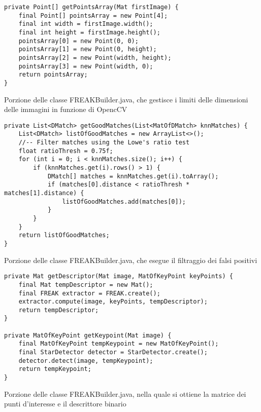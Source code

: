 \begin{listing}[H]
\begin{verbatim}
private Point[] getPointsArray(Mat firstImage) {
    final Point[] pointsArray = new Point[4];
    final int width = firstImage.width();
    final int height = firstImage.height();
    pointsArray[0] = new Point(0, 0);
    pointsArray[1] = new Point(0, height);
    pointsArray[2] = new Point(width, height);
    pointsArray[3] = new Point(width, 0);
    return pointsArray;
}
\end{verbatim}
\caption{Porzione delle classe FREAKBuilder.java, che gestisce i limiti delle dimensioni delle immagini in funzione di OpencCV}\label{lst:points}
\end{listing}


\begin{listing}[H]
\begin{verbatim}
private List<DMatch> getGoodMatches(List<MatOfDMatch> knnMatches) {
    List<DMatch> listOfGoodMatches = new ArrayList<>();
    //-- Filter matches using the Lowe's ratio test
    float ratioThresh = 0.75f;
    for (int i = 0; i < knnMatches.size(); i++) {
        if (knnMatches.get(i).rows() > 1) {
            DMatch[] matches = knnMatches.get(i).toArray();
            if (matches[0].distance < ratioThresh * matches[1].distance) {
                listOfGoodMatches.add(matches[0]);
            }
        }
    }
    return listOfGoodMatches;
}
\end{verbatim}
\caption{Porzione delle classe FREAKBuilder.java, che esegue il filtraggio dei falsi positivi}\label{lst:goodMatches}
\end{listing}

\begin{listing}[H]
\begin{verbatim}
private Mat getDescriptor(Mat image, MatOfKeyPoint keyPoints) {
    final Mat tempDescriptor = new Mat();
    final FREAK extractor = FREAK.create();
    extractor.compute(image, keyPoints, tempDescriptor);
    return tempDescriptor;
}

private MatOfKeyPoint getKeypoint(Mat image) {
    final MatOfKeyPoint tempKeypoint = new MatOfKeyPoint();
    final StarDetector detector = StarDetector.create();
    detector.detect(image, tempKeypoint);
    return tempKeypoint;
}
\end{verbatim}
\caption{Porzione delle classe FREAKBuilder.java, nella quale si ottiene la matrice dei punti d'interesse e il descrittore binario}\label{lst:initData}
\end{listing}

